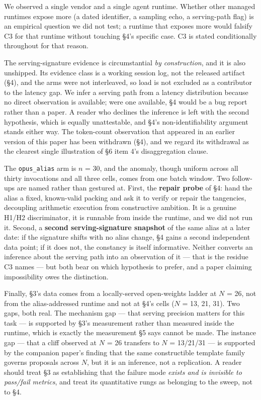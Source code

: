 \documentclass[11pt]{article}
\begin{document}
We observed a single vendor and a single agent runtime. Whether other managed runtimes
expose more (a dated identifier, a sampling echo, a serving-path flag) is an empirical
question we did not test; a runtime that exposes more would falsify C3 for that runtime
without touching \S4's specific case. C3 is stated conditionally throughout for that
reason.

The serving-signature evidence is circumstantial \emph{by construction}, and it is also
unshipped. Its evidence class is a working session log, not the released artifact (\S4),
and the arms were not interleaved, so load is not excluded as a contributor to the
latency gap. We infer a serving path from a latency distribution because no direct
observation is available; were one available, \S4 would be a bug report rather than a
paper. A reader who declines the inference is left with the second hypothesis, which is
equally unattestable, and \S4's non-identifiability argument stands either way. The
token-count observation that appeared in an earlier version of this paper has been
withdrawn (\S4), and we regard its withdrawal as the clearest single illustration of \S6
item 4's disaggregation clause.

The \texttt{opus\_alias} arm is $n$ = 30, and the anomaly, though uniform across all thirty
invocations and all three cells, comes from one batch window. Two follow-ups are named
rather than gestured at. First, the \textbf{repair probe} of \S4: hand the alias a fixed,
known-valid packing and ask it to verify or repair the tangencies, decoupling arithmetic
execution from constructive ambition. It is a genuine H1/H2 discriminator, it is runnable
from inside the runtime, and we did not run it. Second, a \textbf{second serving-signature
snapshot} of the same alias at a later date: if the signature shifts with no alias change,
\S4 gains a second independent data point; if it does not, the constancy is itself
informative. Neither converts an inference about the serving path into an observation of
it --- that is the residue C3 names --- but both bear on which hypothesis to prefer, and a
paper claiming impossibility owes the distinction.

Finally, \S3's data comes from a locally-served open-weights ladder at $N$ = 26, not from
the alias-addressed runtime and not at \S4's cells ($N$ = 13, 21, 31). Two gaps, both real.
The mechanism gap --- that serving precision matters for this task --- is supported by \S3's
measurement rather than measured inside the runtime, which is exactly the measurement \S5
says cannot be made. The instance gap --- that a cliff observed at $N$ = 26 transfers to
$N$ = 13/21/31 --- is supported by the companion paper's finding that the same constructible
template family governs proposals across $N$, but it is an inference, not a replication. A
reader should treat \S3 as establishing that the failure mode \emph{exists and is invisible to
pass/fail metrics}, and treat its quantitative rungs as belonging to the sweep, not to \S4.
\end{document}

